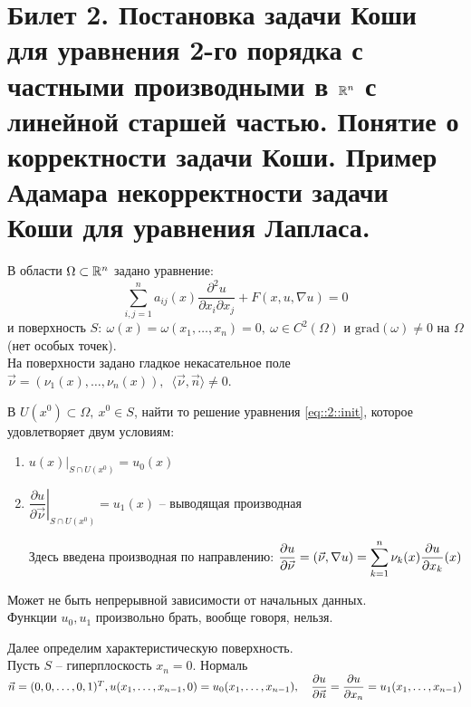 \documentclass[../main.tex]{subfiles}
\begin{document}
\section{Билет 2. Постановка задачи Коши для уравнения 2-го порядка с частными производными в \texorpdfstring{$\mathbb{R}^n$}{R\textasciicircum n} с линейной старшей частью. Понятие о корректности задачи Коши. Пример Адамара некорректности задачи Коши для уравнения Лапласа.}
В области $\Omega \subset \mathbb{R}^n$ задано уравнение:
\begin{equation}
\label{eq::2::init}
\sum\limits_{i,j=1}^{n} a_{ij}(x)\frac{\partial^2u}{\partial x_i\partial x_j} + F(x, u, \nabla u) = 0
\end{equation}
и поверхность $S:\ \omega(x) = \omega(x_1, \dots, x_n) = 0,\ \omega \in C^2(\Omega)$ и $\mathrm{grad}(\omega) \not= 0$ на $\Omega$ (нет особых точек).\\
На поверхности задано гладкое некасательное поле $\vec{\nu} = (\nu_1(x), \dots, \nu_n(x)),\ \; \langle \vec{\nu}, \vec{n} \rangle \not= 0$.
\begin{definition}
В $U(x^0)\subset\Omega,\ x^0 \in S$, найти то решение уравнения \eqref{eq::2::init}, которое удовлетворяет двум условиям:
\begin{enumerate}
\item $u(x)|_{S\cap U(x^0)}=u_0(x)$
\item $\left.\dfrac{\partial u}{\partial \vec{\nu}}\right|_{S\cap U(x^0)} = u_1(x)$ -- выводящая производная

Здесь введена производная по направлению: $\dfrac{\partial u}{\partial \vec{\nu}} = \left(\vec{\nu}, \nabla u\right) = \displaystyle\sum\limits_{k=1}^{n} \nu_k(x)\dfrac{\partial u}{\partial x_k}(x) $
\end{enumerate}
\end{definition}
Может не быть непрерывной зависимости от начальных данных.\\
Функции $u_0, u_1$ произвольно брать, вообще говоря, нельзя.


Далее определим характеристическую поверхность.\\
Пусть $S$ -- гиперплоскость $x_n = 0$. Нормаль $\vec{n} = (0,0,\dots,0, 1)^T,\\
u(x_1, \dots, x_{n-1}, 0) = u_0(x_1, \dots, x_{n-1}),\quad \dfrac{\partial u}{\partial\vec{n}} = \dfrac{\partial u}{\partial x_n} = u_1(x_1, \dots, x_{n-1}) $
\end{document}
